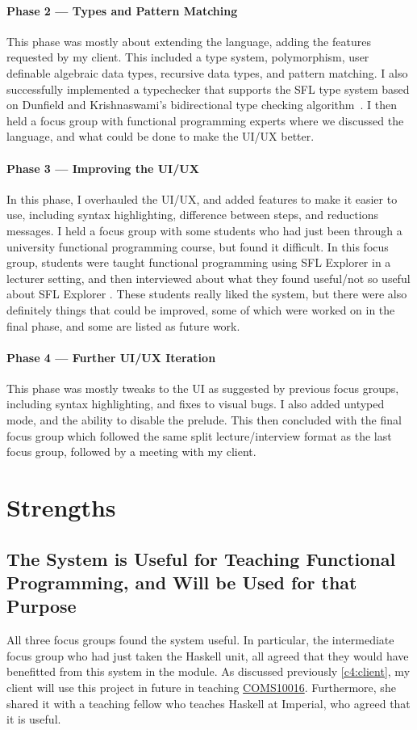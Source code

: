 \paragraph{Phase 2 --- Types and Pattern Matching} This phase was mostly about extending the language, adding the features requested by my client. This included a type system, polymorphism, user definable algebraic data types, recursive data types, and pattern matching. I also successfully implemented a typechecker that supports the \ac{SFL} type system based on Dunfield and Krishnaswami's bidirectional type checking algorithm~\cite{completebidir}. I then held a focus group with functional programming experts where we discussed the language, and what could be done to make the UI/UX better. 
\paragraph{Phase 3 --- Improving the UI/UX} In this phase, I overhauled the UI/UX, and added features to make it easier to use, including syntax highlighting, difference between steps, and reductions messages. I held a focus group with some students who had just been through a university functional programming course, but found it difficult. In this focus group, students were taught functional programming using SFL Explorer  in a lecturer setting, and then interviewed about what they found useful/not so useful about SFL Explorer . These students really liked the system, but there were also definitely things that could be improved, some of which were worked on in the final phase, and some are listed as future work. 

\paragraph{Phase 4 --- Further UI/UX Iteration} This phase was mostly tweaks to the UI as suggested by previous focus groups, including syntax highlighting, and fixes to visual bugs. I also added untyped mode, and the ability to disable the prelude. This then concluded with the final focus group which followed the same split lecture/interview format as the last focus group, followed by a meeting with my client. 


\section{Strengths}
\subsection{The System is Useful for Teaching Functional Programming, and Will be Used for that Purpose}
All three focus groups found the system useful. In particular, the intermediate focus group who had just taken the Haskell unit, all agreed that they would have benefitted from this system in the module. 
As discussed previously \ref{c4:client}, my client will use this project in future in teaching \hyperref[COMS10016]{COMS10016}. Furthermore, she shared it with a teaching fellow who teaches Haskell at Imperial, who agreed that it is useful. 

